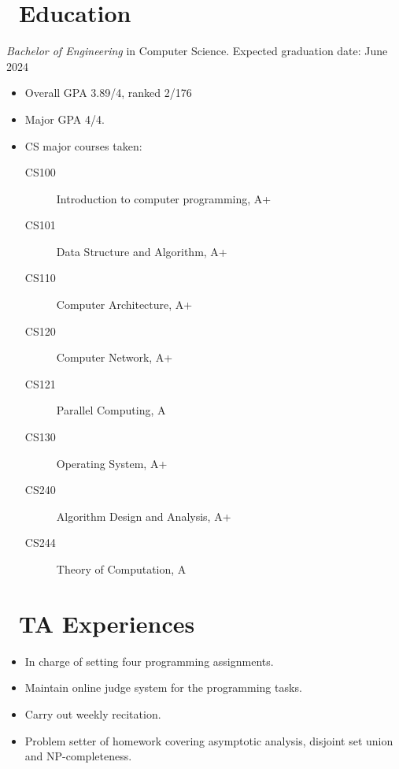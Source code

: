 \documentclass{resume}
\begin{document}



\section{\faGraduationCap\ Education}
\textit{Bachelor of Engineering} in Computer Science. Expected graduation date: June 2024\par
\begin{itemize}
	\item Overall GPA 3.89/4, ranked 2/176
	\item Major GPA 4/4.
	\item CS major courses taken:
	      \begin{description}
		      \item[CS100] Introduction to computer programming, A+
		      \item[CS101] Data Structure and Algorithm, A+
		      \item[CS110] Computer Architecture, A+
		      \item[CS120] Computer Network, A+
		      \item[CS121] Parallel Computing, A
		      \item[CS130] Operating System, A+
		      \item[CS240] Algorithm Design and Analysis, A+
		      \item[CS244] Theory of Computation, A
	      \end{description}
\end{itemize}

\section{\faChalkboardTeacher\ TA Experiences}

\begin{itemize}
	\item In charge of setting four programming assignments.
	\item Maintain online judge system for the programming tasks.
	\item Carry out weekly recitation.
	\item Problem setter of homework covering asymptotic analysis, disjoint set union and NP-completeness.
\end{itemize}
\end{document}
